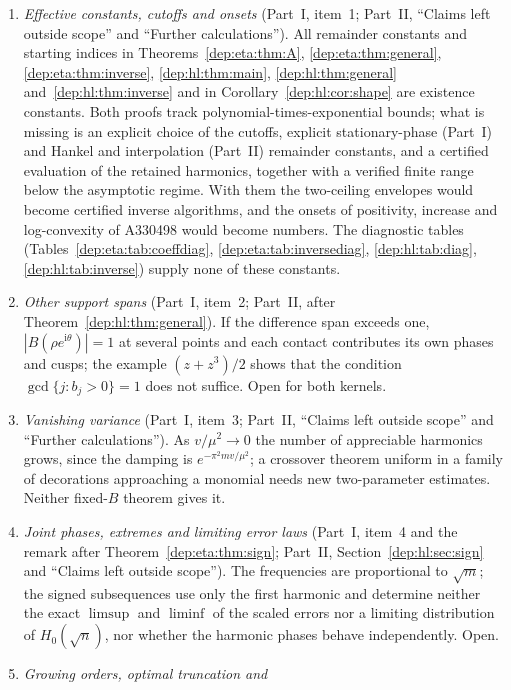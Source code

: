 \documentclass[11pt]{article}
\theoremstyle{definition}\newtheorem{definition}[theorem]{Definition}
\theoremstyle{remark}\newtheorem{remark}[theorem]{Remark}
\newcommand{\ii}{\mathrm i}
\begin{document}
\begin{enumerate}
\item\label{dep:q:effective} \emph{Effective constants, cutoffs and onsets}
(Part~I, item~1; Part~II, ``Claims left outside scope'' and ``Further
calculations''). All remainder constants and starting indices in
Theorems~\ref{dep:eta:thm:A}, \ref{dep:eta:thm:general},
\ref{dep:eta:thm:inverse}, \ref{dep:hl:thm:main}, \ref{dep:hl:thm:general}
and~\ref{dep:hl:thm:inverse} and in Corollary~\ref{dep:hl:cor:shape} are
existence constants. Both proofs track polynomial-times-exponential bounds;
what is missing is an explicit choice of the cutoffs, explicit stationary-phase
(Part~I) and Hankel and interpolation (Part~II) remainder constants, and a
certified evaluation of the retained harmonics, together with a verified
finite range below the asymptotic regime. With them the two-ceiling envelopes
would become certified inverse algorithms, and the onsets of positivity,
increase and log-convexity of A330498 would become numbers. The diagnostic
tables (Tables~\ref{dep:eta:tab:coeffdiag}, \ref{dep:eta:tab:inversediag},
\ref{dep:hl:tab:diag}, \ref{dep:hl:tab:inverse}) supply none of these
constants.
\item\label{dep:q:span} \emph{Other support spans} (Part~I, item~2; Part~II,
after Theorem~\ref{dep:hl:thm:general}). If the difference span exceeds one,
$|B(\rho e^{\ii\theta})|=1$ at several points and each contact contributes its
own phases and cusps; the example $(z+z^3)/2$ shows that the condition
$\gcd\{j:b_j>0\}=1$ does not suffice. Open for both kernels.
\item\label{dep:q:variance} \emph{Vanishing variance} (Part~I, item~3;
Part~II, ``Claims left outside scope'' and ``Further calculations''). As
$v/\mu^2\to0$ the number of appreciable harmonics grows, since the damping is
$e^{-\pi^2mv/\mu^2}$; a crossover theorem uniform in a family of decorations
approaching a monomial needs new two-parameter estimates. Neither fixed-$B$
theorem gives it.
\item\label{dep:q:phases} \emph{Joint phases, extremes and limiting error laws}
(Part~I, item~4 and the remark after Theorem~\ref{dep:eta:thm:sign}; Part~II,
Section~\ref{dep:hl:sec:sign} and ``Claims left outside scope''). The
frequencies are proportional to $\sqrt m$; the signed subsequences use only
the first harmonic and determine neither the exact $\limsup$ and $\liminf$ of
the scaled errors nor a limiting distribution of $H_0(\sqrt n)$, nor whether
the harmonic phases behave independently. Open.
\item\label{dep:q:orders} \emph{Growing orders, optimal truncation and
}
\end{enumerate}
\end{document}
